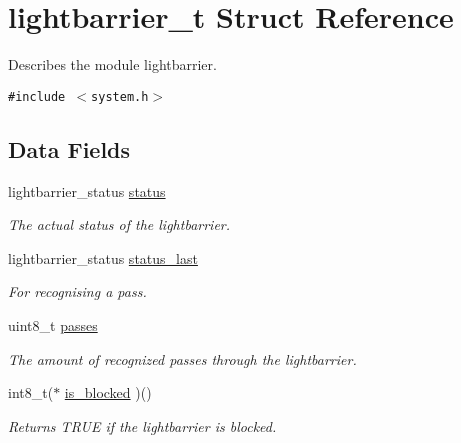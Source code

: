 \hypertarget{structlightbarrier__t}{
\section{lightbarrier\_\-t Struct Reference}
\label{structlightbarrier__t}
}
Describes the module lightbarrier.  


{\tt \#include $<$system.h$>$}

\subsection*{Data Fields}
\begin{CompactItemize}
\item 
\hypertarget{structlightbarrier__t_7d8442ff466cb10fc8507df2c19faf17}{
lightbarrier\_\-status \hyperlink{structlightbarrier__t_7d8442ff466cb10fc8507df2c19faf17}{status}}
\label{structlightbarrier__t_7d8442ff466cb10fc8507df2c19faf17}

\begin{CompactList}\small\item\em The actual status of the lightbarrier. \item\end{CompactList}\item 
\hypertarget{structlightbarrier__t_81cf723bbacceedcc1d4328558a77e3e}{
lightbarrier\_\-status \hyperlink{structlightbarrier__t_81cf723bbacceedcc1d4328558a77e3e}{status\_\-last}}
\label{structlightbarrier__t_81cf723bbacceedcc1d4328558a77e3e}

\begin{CompactList}\small\item\em For recognising a pass. \item\end{CompactList}\item 
\hypertarget{structlightbarrier__t_1440294184c4cfe99bd441730874cb2e}{
uint8\_\-t \hyperlink{structlightbarrier__t_1440294184c4cfe99bd441730874cb2e}{passes}}
\label{structlightbarrier__t_1440294184c4cfe99bd441730874cb2e}

\begin{CompactList}\small\item\em The amount of recognized passes through the lightbarrier. \item\end{CompactList}\item 
\hypertarget{structlightbarrier__t_c8b595c6aeebea02b31d11baea5a0df5}{
int8\_\-t($\ast$ \hyperlink{structlightbarrier__t_c8b595c6aeebea02b31d11baea5a0df5}{is\_\-blocked} )()}
\label{structlightbarrier__t_c8b595c6aeebea02b31d11baea5a0df5}

\begin{CompactList}\small\item\em Returns TRUE if the lightbarrier is blocked. \item\end{CompactList}\end{CompactItemize}


